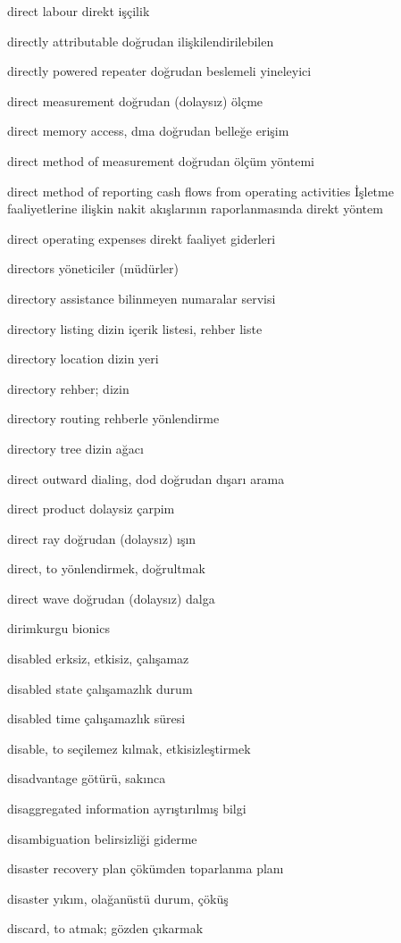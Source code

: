 \documentclass[12pt,fleqn]{article}\usepackage{../../common}
\begin{document}
direct labour direkt işçilik

directly attributable doğrudan ilişkilendirilebilen

directly powered repeater doğrudan beslemeli yineleyici

direct measurement doğrudan (dolaysız) ölçme

direct memory access, dma doğrudan belleğe erişim

direct method of measurement doğrudan ölçüm yöntemi

direct method of reporting cash flows from operating activities İşletme faaliyetlerine ilişkin nakit akışlarının raporlanmasında direkt yöntem

direct operating expenses direkt faaliyet giderleri

directors yöneticiler (müdürler)

directory assistance bilinmeyen numaralar servisi

directory listing dizin içerik listesi, rehber liste

directory location dizin yeri

directory rehber; dizin

directory routing rehberle yönlendirme

directory tree dizin ağacı

direct outward dialing, dod doğrudan dışarı arama

direct product dolaysiz çarpim

direct ray doğrudan (dolaysız) ışın

direct, to yönlendirmek, doğrultmak

direct wave doğrudan (dolaysız) dalga

dirimkurgu bionics

disabled erksiz, etkisiz, çalışamaz

disabled state çalışamazlık durum

disabled time çalışamazlık süresi

disable, to seçilemez kılmak, etkisizleştirmek

disadvantage götürü, sakınca

disaggregated information ayrıştırılmış bilgi

disambiguation belirsizliği giderme

disaster recovery plan çökümden toparlanma planı

disaster yıkım, olağanüstü durum, çöküş

discard, to atmak; gözden çıkarmak
\end{document}
